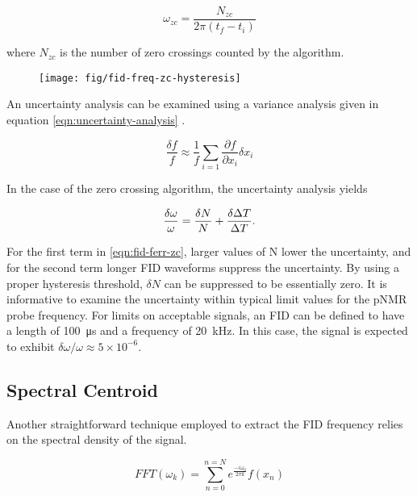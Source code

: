 \begin{equation}
\label{eqn:fig-freq-zc}
\omega_{zc} = \frac{N_{zc}}{2\pi(t_f - t_i)}
\end{equation}

\noindent 
where $N_{zc}$ is the number of zero crossings counted by the algorithm.

\begin{figure}
\label{fig:fid-freq-zc-hysteresis}
\texttt{[image: fig/fid-freq-zc-hysteresis]}
\end{figure}

An uncertainty analysis can be examined using a variance analysis given in equation \ref{eqn:uncertainty-analysis} .

\begin{equation}
\label{eqn:uncertainty-analysis}
\frac{\delta f}{f} \approx \frac{1}{f} \sum_{i = 1} \frac{\partial f}{\partial x_i} \delta x_i
\end{equation}

\noindent
In the case of the zero crossing algorithm, the uncertainty analysis yields

\begin{equation}
\label{eqn:fid-ferr-zc}
\frac{\delta \omega}{\omega} = \frac{\delta N}{N} \\
+ \frac{\delta \Delta T}{\Delta T}.
\end{equation}

\noindent
For the first term in \ref{eqn:fid-ferr-zc}, larger values of N lower the uncertainty, and for the second term longer FID waveforms suppress the uncertainty.  By using a proper hysteresis threshold, $\delta N$ can be suppressed to be essentially zero. It is informative to examine the uncertainty within typical limit values for the pNMR probe frequency.  For limits on acceptable signals, an FID can be defined to have a length of \SI{100}{\micro \second} and a frequency of \SI{20}{\kHz}.  In this case, the signal is expected to exhibit $\delta \omega / \omega \approx 5 \times 10^{-6}$. 


\subsection{Spectral Centroid}
Another straightforward technique employed to extract the FID frequency relies on the spectral density of the signal. 

\begin{equation}
\label{eqn:fid-fft}
FFT(\omega_k) = \sum_{n=0}^{n=N} e^\frac{-i \omega_0}{2\pi k} f(x_n)
\end{equation}

